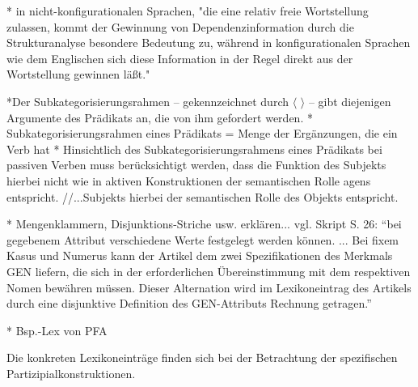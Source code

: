 \documentclass[12pt,a4paper]{article}
\begin{document}
* in nicht-konfigurationalen Sprachen, "die eine
relativ freie Wortstellung zulassen, kommt der Gewinnung von
Dependenzinformation durch die Strukturanalyse besondere
Bedeutung zu, während in konfigurationalen Sprachen wie dem Englischen sich
diese Information in der Regel direkt aus der Wortstellung gewinnen läßt."

*Der Subkategorisierungsrahmen -- gekennzeichnet durch $\langle$ $\rangle$ -- gibt diejenigen Argumente des Prädikats an, die von ihm gefordert werden.
* Subkategorisierungsrahmen eines Prädikats = Menge der Ergänzungen, die ein Verb hat
* Hinsichtlich des Subkategorisierungsrahmens eines Prädikats bei passiven Verben muss berücksichtigt werden, dass die Funktion des Subjekts hierbei nicht wie in aktiven Konstruktionen der semantischen Rolle agens entspricht. //...Subjekts hierbei der semantischen Rolle des Objekts entspricht.

* Mengenklammern, Disjunktions-Striche usw. erklären... vgl. Skript S. 26: ``bei gegebenem Attribut verschiedene Werte festgelegt werden können. ... Bei fixem Kasus und Numerus kann der Artikel dem zwei Spezifikationen des Merkmals GEN
liefern, die sich in der erforderlichen Übereinstimmung mit dem respektiven Nomen bewähren
müssen. Dieser Alternation wird im Lexikoneintrag des Artikels durch eine disjunktive
Definition des GEN-Attributs Rechnung getragen.''


* Bsp.-Lex von PFA

Die konkreten Lexikoneinträge finden sich bei der Betrachtung der spezifischen Partizipialkonstruktionen.












\end{document}
